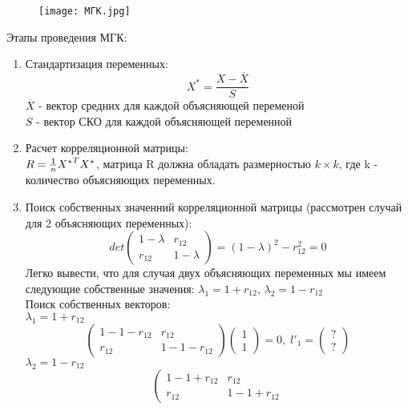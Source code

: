 \documentclass[a4paper,12pt]{article} %
\begin{document}
\begin{figure}[htp]
    \centering
    \texttt{[image: МГК.jpg]}
\end{figure}

Этапы проведения МГК:
\begin{enumerate}
    \item Стандартизация переменных:
\[X^*=\frac{X-\overline{X}}{S}\]
$\overline{X}$ - вектор средних для каждой объясняющей переменой \\
$S$ - вектор СКО для каждой объясняющей переменной
    \item Расчет корреляционной матрицы:\\
$R={{1}\over{n}}{X^*}^TX^*$, матрица R должна обладать размерностью $k\times k$, где k - количество объясняющих переменных.
    \item Поиск собственных значенний корреляционной матрицы (рассмотрен случай для 2 объясняющих переменных):
\begin{equation*}
    det \left(
\begin{array}{cc}
     1-\lambda&r_{12}  \\
     r_{12}&1-\lambda
\end{array}
\right)=(1-\lambda)^2-r_{12}^2=0
\end{equation*}
Легко вывести, что для случая двух объясняющих переменных мы имеем следующие собственные значения:
$\lambda_1=1+r_{12}$, 
$\lambda_2=1-r_{12}$\\
Поиск собственных векторов:\\
$\lambda_1=1+r_{12}$\\
\begin{equation*}
    \left(
\begin{array}{cc}
     1-1-r_{12}&r_{12}  \\
     r_{12}&1-1-r_{12}
\end{array}
\right)
\left(
\begin{array}{c}
     1  \\
    1
\end{array}
\right)=0, \;
l'_1=\left(
\begin{array}{c}
     ?  \\
    ?
\end{array}
\right)
\end{equation*}
$\lambda_2=1-r_{12}$\\
\begin{equation*}
    \left(
\begin{array}{cc}
     1-1+r_{12}&r_{12}  \\
     r_{12}&1-1+r_{12}

\end{array}
\end{equation*}
\end{enumerate}
\end{document}
